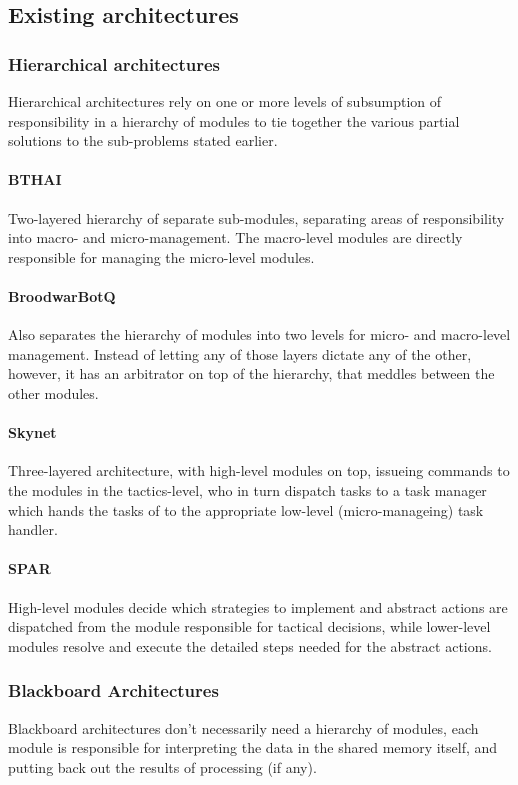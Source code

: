 \subsection{Existing architectures}

\subsubsection{Hierarchical architectures}
Hierarchical architectures rely on one or more levels of subsumption of
responsibility in a hierarchy of modules to tie together the various partial
solutions to the sub-problems stated earlier.

\paragraph{BTHAI}
Two-layered hierarchy of separate sub-modules, separating areas of
responsibility into macro- and micro-management. The macro-level modules are
directly responsible for managing the micro-level modules.

\paragraph{BroodwarBotQ}
Also separates the hierarchy of modules into two levels for micro- and
macro-level management. Instead of letting any of those layers dictate any of
the other, however, it has an arbitrator on top of the hierarchy, that meddles
between the other modules.

\paragraph{Skynet}
Three-layered architecture, with high-level modules on top, issueing commands
to the modules in the tactics-level, who in turn dispatch tasks to a task
manager which hands the tasks of to the appropriate low-level
(micro-manageing) task handler.

\paragraph{SPAR}
High-level modules decide which strategies to implement and abstract actions
are dispatched from the module responsible for tactical decisions, while
lower-level modules resolve and execute the detailed steps needed for the
abstract actions.

\subsubsection{Blackboard Architectures}
Blackboard architectures don't necessarily need a hierarchy of modules, each
module is responsible for interpreting the data in the shared memory itself,
and putting back out the results of processing (if any).

